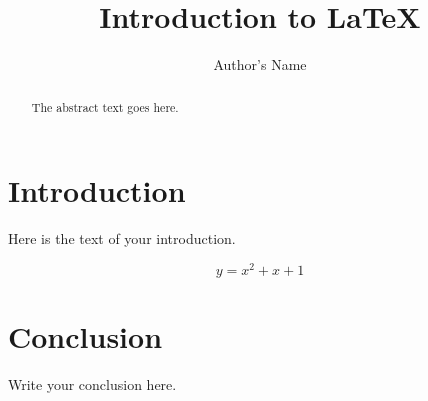 \documentclass{article}
\begin{document}
\title{Introduction to \LaTeX{}}
\author{Author's Name}

\maketitle

\begin{abstract}
The abstract text goes here.
\end{abstract}

\section{Introduction}
Here is the text of your introduction.

\begin{equation}
    \label{simple_equation}
    y = x^2+x+1
\end{equation}

\section{Conclusion}
Write your conclusion here.
\end{document}
